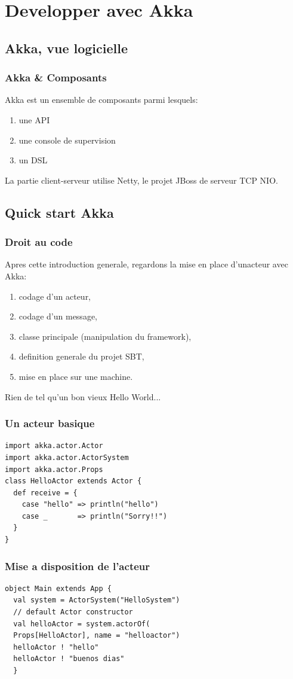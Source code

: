 \documentclass[xcolor=dvipsnames]{beamer}
\begin{document}
\section{Developper avec Akka}
\subsection{Akka, vue logicielle}
\begin{frame}
  \frametitle{Akka \& Composants}
  Akka est un ensemble de composants parmi lesquels:
  \begin{enumerate}
  \item une API
  \item une console de supervision
  \item un DSL
  \end{enumerate}
  La partie client-serveur utilise Netty, le projet JBoss de
  serveur TCP NIO.
\end{frame}

\subsection{Quick start Akka}
\begin{frame}
  \frametitle{Droit au code}
  Apres cette introduction generale, regardons la mise en place d'unacteur avec Akka:
  \begin{enumerate}
   \item codage d'un acteur,
   \item codage d'un message,
   \item classe principale (manipulation du framework),
   \item definition generale du projet SBT,
   \item  mise en place sur une machine.
  \end{enumerate}
  Rien de tel qu'un bon vieux Hello World...
\end{frame}

\begin{frame}[fragile]
  \frametitle{Un acteur basique}
  \lstset{frameround=fttt}
\begin{lstlisting}[frame=trBL]
import akka.actor.Actor
import akka.actor.ActorSystem
import akka.actor.Props
class HelloActor extends Actor {
  def receive = {
    case "hello" => println("hello")
    case _       => println("Sorry!!")
  }
}
  \end{lstlisting}
\end{frame}

\begin{frame}[fragile]
  \frametitle{Mise a disposition de l'acteur}
   \lstset{frameround=fttt}
\begin{lstlisting}[frame=trBL]
  object Main extends App {
  val system = ActorSystem("HelloSystem")
  // default Actor constructor
  val helloActor = system.actorOf(
  Props[HelloActor], name = "helloactor")
  helloActor ! "hello"
  helloActor ! "buenos dias"
  }
\end{lstlisting}
\end{frame}
\end{document}
